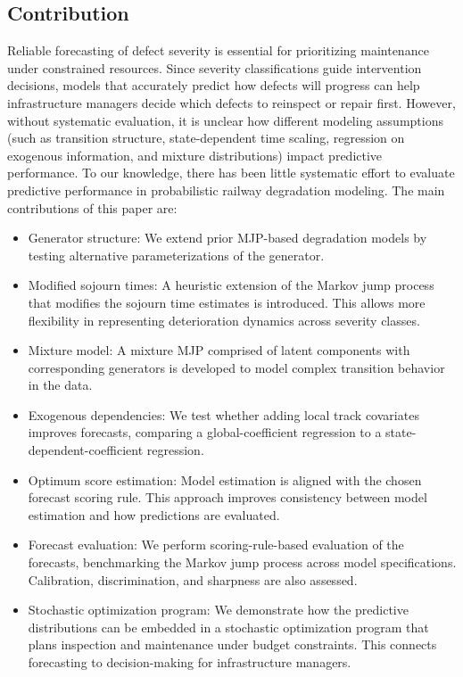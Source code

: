 \documentclass{article}
\begin{document}
\subsection{Contribution}
Reliable forecasting of defect severity is essential for prioritizing maintenance under constrained resources. Since severity classifications guide intervention decisions, models that accurately predict how defects will progress can help infrastructure managers decide which defects to reinspect or repair first. However, without systematic evaluation, it is unclear how different modeling assumptions (such as transition structure, state-dependent time scaling, regression on exogenous information, and mixture distributions) impact predictive performance. To our knowledge, there has been little systematic effort to evaluate predictive performance in probabilistic railway degradation modeling. 
The main contributions of this paper are:

\begin{itemize}
    \item Generator structure: We extend prior MJP-based degradation models by testing alternative parameterizations of the generator.    
    \item Modified sojourn times: A heuristic extension of the Markov jump process that modifies the sojourn time estimates is introduced. This allows more flexibility in representing deterioration dynamics across severity classes.
      \item Mixture model: A mixture MJP comprised of latent components with corresponding generators is developed to model complex transition behavior in the data.
    \item Exogenous dependencies: We test whether adding local track covariates improves forecasts, comparing a global-coefficient regression to a state-dependent-coefficient regression.
     \item Optimum score estimation: Model estimation is aligned with the chosen forecast scoring rule. This approach improves consistency between model estimation and how predictions are evaluated.
     \item Forecast evaluation: We perform scoring-rule-based evaluation of the forecasts, benchmarking the Markov jump process across model specifications. Calibration, discrimination, and sharpness are also assessed. %
    \item Stochastic optimization program: We demonstrate how the predictive distributions can be embedded in a stochastic optimization program that plans inspection and maintenance under budget constraints. This connects forecasting to decision-making for infrastructure managers.
\end{itemize}
\end{document}
